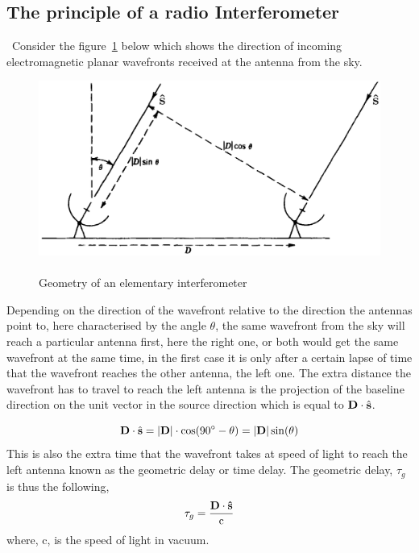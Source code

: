 \subsection{The principle of a radio Interferometer}
\label{sec:intPrincipia}
{\citep[From][Sec.~2.1]{thompson2008interferometry}}~Consider the figure~\ref{fig:RadioSet} below which shows the direction of incoming electromagnetic planar wavefronts received at the antenna from the sky.
\begin{figure}[htbp]
\center
    \includegraphics[scale= 0.9]{Figures/RadioSet}
 	\caption[An elementary interferometer]{\\Geometry of an elementary interferometer~\citep[Pg.~51,~Fig.~2.1]{thompson2008interferometry}}
	\label{fig:RadioSet}
\end{figure}
Depending on the direction of the wavefront relative to the direction the antennas point to, here characterised by the angle $\theta$, the same wavefront from the sky will reach a particular antenna first, here the right one, or both would get the same wavefront at the same time, in the first case it is only after a certain lapse of time that the wavefront reaches the other antenna, the left one. The extra distance the wavefront has to travel to reach the left antenna is the projection of the baseline direction on the unit vector in the source direction which is equal to ${\bf D}\cdot \hat{\bf s}$.

\begin{equation}
{\bf D}\cdot\hat{\bf s} = |{\bf D}|\cdot\cos(90^{\circ} - \theta)= |{\bf D}|\sin(\theta)
\end{equation}
This is also the extra time that the wavefront takes at speed of light to reach the left antenna known as the geometric delay or time delay. The geometric delay, $\tau_{g}$ is thus the following,
\begin{equation}
\tau_{g}=  \frac{{\bf D}\cdot {\bf \hat{s}}}{\textrm{c}}     
\end{equation}
where, c, is the speed of light in vacuum.

